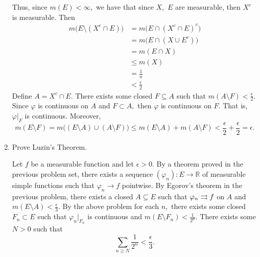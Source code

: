 \documentclass[11pt]{article}
\newcommand{\bbR}{\mathbb{R}}
\newcommand{\sm}{\setminus}
\begin{document}
\begin{enumerate}
\begin{solution}
        Thus, since $m(E) < \infty,$ we have that since $X,$ $E$ are measurable, then $X^c$ is measurable. Then
        \begin{align*}
            m\big(E \sm (X^c\cap E)\big) &= m\big(E \cap (X^c \cap E)^c\big)\\
            &= m\big(E \cap (X \cup E^c)\big)\\
            &= m(E\cap X)\\
            &\leq m(X)\\
            & = \frac{1}{n}\\
            &< \frac{\epsilon}{2}
        \end{align*}
        Define $A = X^c \cap E.$ There exists some closed $F\subseteq A$ such that $m(A\sm F) < \frac{\epsilon}{2}.$ Since $\varphi$ is continuous on $A$ and $F\subset A,$ then $\varphi$ is continuous on $F.$ That is, $\varphi|_F$ is continuous. Moreover, 
                \[m(E\sm F)= m\big((E \sm A) \cup (A \sm F)\big) \leq m(E\sm A) + m(A\sm F) < \frac{\epsilon}{2} + \frac{\epsilon}{2} = \epsilon.\] 
    \end{solution}
    \item Prove Luzin's Theorem.
    \begin{solution}
        Let $f$ be a measurable function and let $\epsilon>0$. By a theorem proved in the previous problem set, there exists a sequence $(\varphi_n): E\to \bbR$ of measurable simple functions such that $\varphi_n \to f$ pointwise. By Egorov's theorem in the previous problem, there exists a closed $A\subseteq E$ such that $\varphi_n \overset{}{\rightrightarrows} f$ on $A$ and $m(E\sm A)< \frac{\epsilon}{3}.$ By the above problem for each $n,$ there exists some closed $F_n\subset E$ such that $\varphi_n|_{F_n}$ is continuous and $m(E\sm F_n) < \frac{1}{2^n}.$ There exists some $N >0$ such that
        \[\sum_{n\geq N}\frac{1}{2^n} < \frac{\epsilon}{3}.\]


\end{solution}
\end{enumerate}
\end{document}
